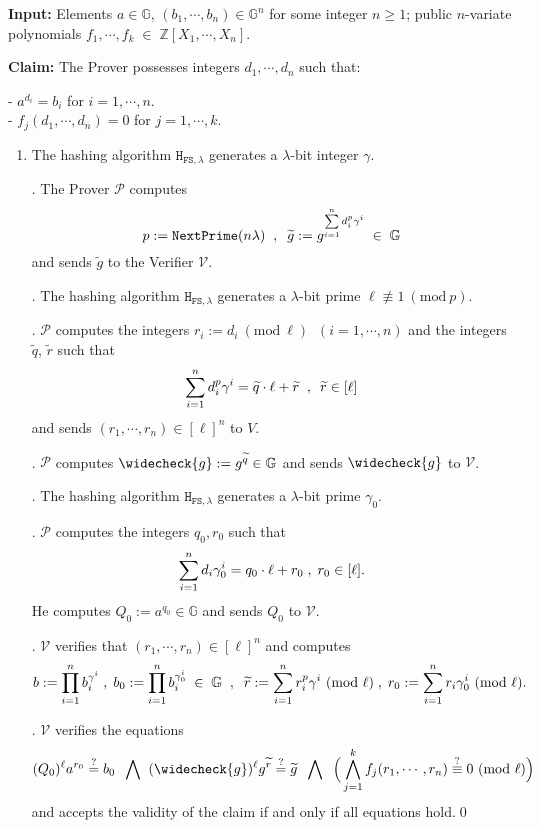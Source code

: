 \documentclass[11pt, lettersize, notitlepage, leqno, footskip=0.6cm]{article}
\newcommand{\bz}{\mathbb Z}
\newcommand{\pl}{\prod\limits}
\newcommand{\slim}{\sum\limits}
\newcommand{\ttt}{\texttt}
\newcommand{\bG}{\mathbb{G}}
\newcommand{\wti}{\widetilde}
\newcommand{\mc}{\mathcal}
\newcommand{\mb}{\mathbb}
\newcommand{\lam}{\lambda}
\newcommand{\weck}{\widecheck}
\newcommand{\mP}{\mc{P}}
\newcommand{\V}{\mc{V}}
\newcommand{\vs}{\vspace{-0.15cm}}
\newcommand{\noin}{\noindent}
\newcommand{\sta}{\stackrel{?}{=}}
\newcommand{\Mod}[1]{\ (\mathrm{mod}\ #1)}
\numberwithin{equation}{section}
\begin{document}
\noin \textbf{Input:} Elements $a\in\mb{G} $, $(b_1,\cdots,b_n)\in \mb{G}^n$ for some integer $n\geq 1$; public $n$-variate polynomials $f_1,\cdots,f_k\;\in\; \bz[X_1,\cdots,X_n]$.

\noin \textbf{Claim:} The Prover possesses integers $d_1,\cdots, d_n$ such that:

\noindent- $a^{d_i} = b_i$ for $i = 1,\cdots, n$.\\
- $f_j(d_1,\cdots,d_n) = 0$ for $j = 1,\cdots, k$.

\begin{enumerate}[wide, labelwidth=!, labelindent=0pt] \item The hashing algorithm $\ttt{H}_{\ttt{FS},\lam}$ generates a $\lam$-bit integer $\gamma$.

\noin 2. The Prover $\mc{P}$ computes \vs $$p:= \ttt{NextPrime}(n\lam)\;\;,\;\;\wti{g} :=g^{\sum\limits_{i=1}^n d_i^{p}\gamma^i}\;\in\;\bG\vs $$ and sends $\wti{g}$ to the Verifier $\mc{V}$.

\noin 3. The hashing algorithm $\ttt{H}_{\ttt{FS},\lam}$ generates a $\lam$-bit prime $\ell\not\equiv 1\Mod{p}$.
 
\noin 4. $\mc{P}$ computes the integers $r_i:=d_i\Mod{\ell}\;\; (i=1,\cdots, n)$ and the integers $\wti{q}$, $\wti{r}$ such that \vs $$\slim_{i=1}^n d_i^{p}\gamma^i = \wti{q} \cdot \ell+\wti{r}\;\;,\:\;\wti{r}\in [\ell] \vs $$ and sends $(r_1,\cdots,r_n)\in [\ell]^n$ to $V$.

\noin 5. $\mP$ computes $\weck{g}:= g^{\wti{q}}\in \bG$ and sends $\weck{g}$ to  $\V$. 

\noin 6. The hashing algorithm $\ttt{H}_{\ttt{FS},\lam}$ generates a $\lam$-bit prime $\gamma_{0}$.

\noin 7. $\mP$ computes the integers $q_0, r_0$ such that \vs $$\slim_{i=1}^n d_i\gamma_{0}^i = q_0 \cdot \ell+r_0\;,\;r_0\in[\ell] . \vs$$ He computes $Q_0:= a^{q_{0}}\in \bG$ and sends $Q_0$ to $\V$.

\noin 8. $\mc{V}$ verifies that $(r_1,\cdots,r_n)\in [\ell]^n$ and computes \vs $$b := \pl_{i=1}^n b_i^{\gamma^i}\;,\;b_0 := \pl_{i=1}^n b_i^{\gamma_{0}^i}\;\in \;\bG\;\;,\;\;\wti{r}:= \slim_{i=1}^n r_i^{p}\gamma^i\Mod{\ell}\;,\;r_0:=\slim_{i=1}^n r_i\gamma_{0}^i\Mod{\ell}. \vs $$ 

\noin 9. $\mc{V}$ verifies the equations \vspace{-0.3cm} $$ (Q_0)^{\ell} a^{r_{0}} \sta b_0 \;\;\bigwedge\;\; (\weck{g})^{\ell}g^{\wti{r}} \stackrel{?}{=}\wti{g} \;\;\bigwedge\;\;\Big( \bigwedge\limits_{j=1}^k  f_j(r_1,\cdots,r_n) \stackrel{?}{\equiv} 0\Mod{\ell} \Big) \vs $$ and accepts the validity of the claim if and only if all equations hold.\qed \end{enumerate}
\end{document}
